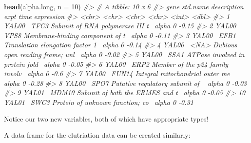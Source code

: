 \documentclass[]{book}
\newenvironment{Shaded}{\begin{snugshade}}{\end{snugshade}}
\newcommand{\CommentTok}[1]{\textcolor[rgb]{0.56,0.35,0.01}{\textit{#1}}}
\newcommand{\DataTypeTok}[1]{\textcolor[rgb]{0.13,0.29,0.53}{#1}}
\newcommand{\DecValTok}[1]{\textcolor[rgb]{0.00,0.00,0.81}{#1}}
\newcommand{\KeywordTok}[1]{\textcolor[rgb]{0.13,0.29,0.53}{\textbf{#1}}}
\newcommand{\NormalTok}[1]{#1}
\newcommand{\OperatorTok}[1]{\textcolor[rgb]{0.81,0.36,0.00}{\textbf{#1}}}
\newcommand{\OtherTok}[1]{\textcolor[rgb]{0.56,0.35,0.01}{#1}}
\newcommand{\StringTok}[1]{\textcolor[rgb]{0.31,0.60,0.02}{#1}}
\theoremstyle{definition}
\theoremstyle{definition}
\theoremstyle{definition}
\theoremstyle{remark}
\begin{document}
\begin{Shaded}
\begin{Highlighting}[]
\KeywordTok{head}\NormalTok{(alpha.long, }\DataTypeTok{n =} \DecValTok{10}\NormalTok{)}
\CommentTok{#> # A tibble: 10 x 6}
\CommentTok{#>    gene   std.name description                      expt   time expression}
\CommentTok{#>    <chr>  <chr>    <chr>                            <chr> <int>      <dbl>}
\CommentTok{#>  1 YAL00~ TFC3     Subunit of RNA polymerase III t~ alpha     0      -0.15}
\CommentTok{#>  2 YAL00~ VPS8     Membrane-binding component of t~ alpha     0      -0.11}
\CommentTok{#>  3 YAL00~ EFB1     Translation elongation factor 1~ alpha     0      -0.14}
\CommentTok{#>  4 YAL00~ <NA>     Dubious open reading frame; unl~ alpha     0      -0.02}
\CommentTok{#>  5 YAL00~ SSA1     ATPase involved in protein fold~ alpha     0      -0.05}
\CommentTok{#>  6 YAL00~ ERP2     Member of the p24 family involv~ alpha     0      -0.6 }
\CommentTok{#>  7 YAL00~ FUN14    Integral mitochondrial outer me~ alpha     0      -0.28}
\CommentTok{#>  8 YAL00~ SPO7     Putative regulatory subunit of ~ alpha     0      -0.03}
\CommentTok{#>  9 YAL01~ MDM10    Subunit of both the ERMES and t~ alpha     0      -0.05}
\CommentTok{#> 10 YAL01~ SWC3     Protein of unknown function; co~ alpha     0      -0.31}
\end{Highlighting}
\end{Shaded}

Notice our two new variables, both of which have appropriate types!

A data frame for the elutriation data can be created similarly:

\begin{Shaded}
\end{Shaded}
\end{document}
